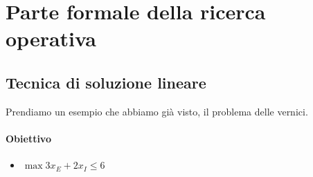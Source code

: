 \documentclass[12pt, twoside, letterpaper]{article}
\begin{document}
	\section{Parte formale della ricerca operativa}
		\subsection{Tecnica di soluzione lineare}
			Prendiamo un esempio che abbiamo già visto, il problema delle vernici.
			\paragraph{Obiettivo} 
				\begin{itemize} 
					\item $\max 3x_E + 2x_I \leq 6$ 
				\end{itemize}
				
\end{document}
